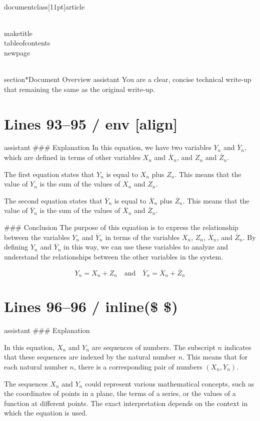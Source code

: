 \\documentclass[11pt]{article}
\begin{document}
\\maketitle
\\tableofcontents
\\newpage

\\section*{Document Overview}
assistant
You are a clear, concise technical write-up that remaining the same as the original write-up.

\newpage

\section*{Lines 93–95 / env [align]}
assistant
### Explanation
In this equation, we have two variables \( Y_n \) and \( \overline{Y}_n \), which are defined in terms of other variables \( X_n \) and \( \overline{X}_n \), and \( Z_n \) and \( \overline{Z}_n \).

The first equation states that \( Y_n \) is equal to \( X_n \) plus \( Z_n \). This means that the value of \( Y_n \) is the sum of the values of \( X_n \) and \( Z_n \).

The second equation states that \( \overline{Y}_n \) is equal to \( \overline{X}_n \) plus \( \overline{Z}_n \). This means that the value of \( \overline{Y}_n \) is the sum of the values of \( \overline{X}_n \) and \( \overline{Z}_n \).

### Conclusion
The purpose of this equation is to express the relationship between the variables \( Y_n \) and \( \overline{Y}_n \) in terms of the variables \( X_n \), \( Z_n \), \( \overline{X}_n \), and \( \overline{Z}_n \). By defining \( Y_n \) and \( \overline{Y}_n \) in this way, we can use these variables to analyze and understand the relationships between the other variables in the system.

\[
\boxed{Y_n = X_n + Z_n \quad \text{and} \quad \overline{Y}_n = \overline{X}_n + \overline{Z}_n}
\]


\section*{Lines 96–96 / inline(\$ \$) }
assistant
### Explanation

In this equation, \(X_n\) and \(Y_n\) are sequences of numbers. The subscript \(n\) indicates that these sequences are indexed by the natural number \(n\). This means that for each natural number \(n\), there is a corresponding pair of numbers \((X_n, Y_n)\).

The sequences \(X_n\) and \(Y_n\) could represent various mathematical concepts, such as the coordinates of points in a plane, the terms of a series, or the values of a function at different points. The exact interpretation depends on the context in which the equation is used.
\end{document}
